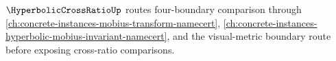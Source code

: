 $\HyperbolicCrossRatioUp$ routes four-boundary comparison through \autoref{ch:concrete-instances-mobius-transform-namecert}, \autoref{ch:concrete-instances-hyperbolic-mobius-invariant-namecert}, and the visual-metric boundary route before exposing cross-ratio comparisons.





